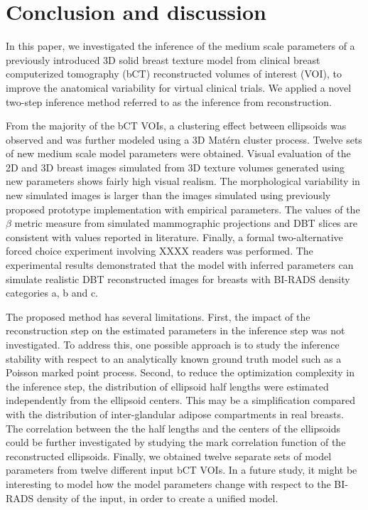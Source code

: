 \documentclass[journal]{IEEEtran}
\begin{document}
\section{Conclusion and discussion}
\label{sec:concl-disc}

In this paper, we investigated the inference of the medium scale
parameters of a previously introduced 3D solid breast texture model
from clinical breast computerized tomography (bCT) reconstructed
volumes of interest (VOI), to improve the anatomical variability for
virtual clinical trials. We applied a novel two-step inference method
referred to as the inference from reconstruction.

From the majority of the bCT VOIs, a clustering effect between
ellipsoids was observed and was further modeled using a 3D Mat\'{e}rn
cluster process. Twelve sets of new medium scale model parameters were
obtained. Visual evaluation of the 2D and 3D breast images simulated
from 3D texture volumes generated using new parameters shows fairly
high visual realism. The morphological variability in new simulated
images is larger than the images simulated using previously proposed
prototype implementation with empirical parameters. The values of the
$\beta$ metric measure from simulated mammographic projections and DBT
slices are consistent with values reported in literature. Finally, a
formal two-alternative forced choice experiment involving XXXX readers
was performed. The experimental results demonstrated that the model
with inferred parameters can simulate realistic DBT reconstructed images
for breasts with BI-RADS density categories a, b and c.

The proposed method has several limitations. First, the impact of the
reconstruction step on the estimated parameters in the inference step
was not investigated. To address this, one possible approach is to
study the inference stability with respect to an analytically known
ground truth model such as a Poisson marked point process. Second, to
reduce the optimization complexity in the inference step, the
distribution of ellipsoid half lengths were estimated independently
from the ellipsoid centers. This may be a simplification compared with
the distribution of inter-glandular adipose compartments in real
breasts. The correlation between the the half lengths and the centers
of the ellipsoids could be further investigated by studying the mark
correlation function of the reconstructed ellipsoids. Finally, we
obtained twelve separate sets of model parameters from twelve
different input bCT VOIs. In a future study, it might be interesting
to model how the model parameters change with respect to the BI-RADS
density of the input, in order to create a unified model.
\end{document}
